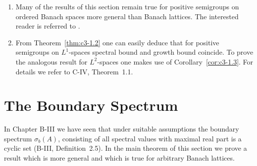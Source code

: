 \begin{remarks}\label{rem:c3-1.7}
\begin{enumerate}[\upshape (i), wide, labelindent=.5em]
	\item 
	Many of the results of this section remain true for positive semigroups on ordered Banach spaces more general than Banach lattices.
	The interested reader is referred to \citet{greinervoigtwolff:1981}.
	
	\item 
	From Theorem~\ref{thm:c3-1.2} one can easily deduce that for positive semigroups on $L^1$-spaces spectral bound and growth bound coincide.
	To prove the analogous result for $L^2$-spaces one makes use of Corollary~\ref{cor:c3-1.3}.
	For details we refer to C-IV, Theorem~1.1.
\end{enumerate}
\end{remarks}

\section{The Boundary Spectrum}\label{sec:c3-2}
In Chapter B-III we have seen that under suitable assumptions the boundary spectrum $\sigma_{b}(A)$, consisting of all spectral values with maximal real part is a cyclic set (\cf B-III, Definition~2.5).
In the main theorem of this section we prove a result which is more general and which is true for arbitrary Banach lattices.


